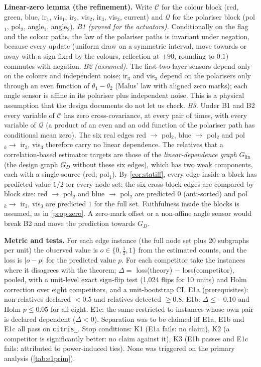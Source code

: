 \textbf{Linear-zero lemma (the refinement).} Write $\mathcal C$ for the colour block (red, green, blue, ir$_1$,
vis$_1$, ir$_2$, vis$_2$, ir$_3$, vis$_3$, current) and $\mathcal Q$ for the polariser block (pol$_1$, pol$_2$, angle$_1$, angle$_2$).
\emph{B1 (proved for the actuators).} Conditionally on the flag and the colour paths, the law of the polariser
paths is invariant under negation, because every update (uniform draw on a symmetric interval, move towards or
away with a sign fixed by the colours, reflection at $\pm90$, rounding to $0.1$) commutes with negation.
\emph{B2 (assumed).} The first-two-layer sensors depend only on the colours and independent noise; ir$_3$ and vis$_3$
depend on the polarisers only through an even function of $\theta_1-\theta_2$ (Malus' law with aligned zero marks); each angle sensor is affine in its polariser plus
independent noise. This is a physical assumption that the design documents do not let us check.
\emph{B3.} Under B1 and B2 every variable of $\mathcal C$ has zero cross-covariance, at every pair of times, with every variable of
$\mathcal Q$ (a product of an even and an odd function of the polariser path has conditional mean zero). The six real edges
red $\to$ pol$_2$, blue $\to$ pol$_2$ and pol$_k\to$ ir$_3$, vis$_3$ therefore carry no linear dependence. The relatives that a
correlation-based estimator targets are those of the \emph{linear-dependence graph} $G_{\mathrm{lin}}$ (the design graph $G_D$ without these six edges),
which has two weak components, each with a single source (red; pol$_1$). By \cref{cor:statiff}, every edge inside a block has predicted value $1/2$ for every node set; the six cross-block
edges are compared by block size: red $\to$ pol$_2$ and blue $\to$ pol$_2$ are predicted $0$ (anti-sorted) and pol$_k\to$ ir$_3$, vis$_3$ are predicted $1$ for the full set.
Faithfulness inside the blocks is assumed, as in \cref{prop:zero}. A zero-mark offset or a non-affine angle sensor would break B2 and move the prediction towards $G_D$.

\textbf{Metric and tests.} For each edge instance (the full node set plus 20 subgraphs per unit) the observed value is
$o\in\{0,\frac12,1\}$ from the estimated counts, and the loss is $|o-p|$ for the predicted value $p$. For each competitor take the instances where it disagrees with the theorem;
$\Delta=$ loss(theory) $-$ loss(competitor), pooled, with a unit-level exact sign-flip test (1{,}024 flips for 10 units) and Holm correction over eight competitors, and a unit-bootstrap CI.
E1a (prerequisites): non-relatives declared $<0.5$ and relatives detected $\ge0.8$. E1b: $\Delta\le-0.10$ and Holm $p\le0.05$ for all eight. E1c: the same restricted to instances whose own pair is declared dependent ($\Delta<0$).
Separation was to be claimed iff E1a, E1b and E1c all pass on \texttt{citris\_}. Stop conditions: K1 (E1a fails: no claim), K2 (a competitor is significantly better: no claim against it), K3 (E1b passes and E1c fails: attributed to power-induced ties).
None was triggered on the primary analysis (\cref{tab:e1prim}).

